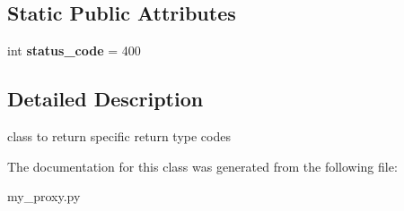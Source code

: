 \subsection*{Static Public Attributes}
\begin{DoxyCompactItemize}
\item 
\mbox{\label{classdocker-proxy_1_1my__proxy_1_1_invalid_usage_aa06f3c7722ee51c93e799a0e57f67a32}} 
int {\bfseries status\+\_\+code} = 400
\end{DoxyCompactItemize}


\subsection{Detailed Description}
\begin{DoxyVerb}class to return specific return type codes
\end{DoxyVerb}
 

The documentation for this class was generated from the following file\+:\begin{DoxyCompactItemize}
\item 
my\+\_\+proxy.\+py\end{DoxyCompactItemize}
